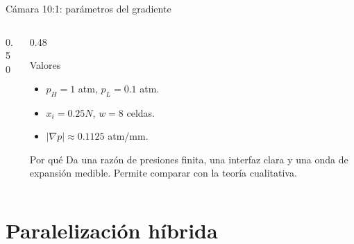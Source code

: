 \documentclass[aspectratio=169]{beamer}
\begin{document}
\begin{frame}{Cámara 10:1: parámetros del gradiente}
  \begin{columns}[T]
    \begin{column}{0.50\textwidth}
      \centering
    \end{column}
    \begin{column}{0.48\textwidth}
      \begin{block}{Valores}
        \footnotesize
        \begin{itemize}
          \item $p_H=1$ atm, $p_L=0.1$ atm.
          \item $x_i=0.25N$, $w=8$ celdas.
          \item $|\nabla p|\approx 0.1125$ atm/mm.
        \end{itemize}
      \end{block}
      \begin{block}{Por qué}
        \footnotesize
        Da una razón de presiones finita, una interfaz clara y una onda de
        expansión medible. Permite comparar con la teoría cualitativa.
      \end{block}
    \end{column}
  \end{columns}
\end{frame}

\section{Paralelización híbrida}
\end{document}
